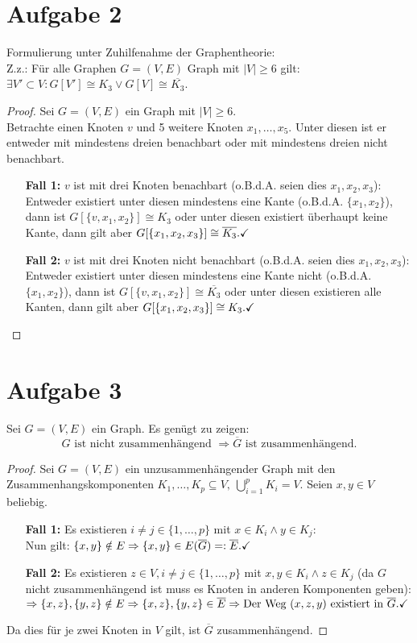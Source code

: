 \documentclass[a4paper,10pt,german]{scrartcl}
\newcommand{\komp}[1]{\ensuremath{\overline{#1}}}
\begin{document}
\section*{Aufgabe 2}
Formulierung unter Zuhilfenahme der Graphentheorie:\\
Z.z.: Für alle Graphen $G=(V,E)$ Graph mit $|V|\geq6$ gilt: $\exists V'\subset V:G[V']\cong K_3\vee G[V]\cong \komp{K_3}$.
\begin{proof}
 Sei $G=(V,E)$ ein Graph mit $|V|\geq6$.\\
 Betrachte einen Knoten $v$ und 5 weitere Knoten $x_1,\dots,x_5$. Unter diesen ist er entweder mit mindestens dreien benachbart oder mit mindestens dreien nicht benachbart.
 \begin{itemize}
  \item[{\bf Fall 1:}]$v$ ist mit drei Knoten benachbart (o.B.d.A. seien dies $x_1,x_2,x_3$):\\
  Entweder existiert unter diesen mindestens eine Kante (o.B.d.A. $\{x_1,x_2\}$), dann ist $G[\{v,x_1,x_2\}]\cong K_3$ oder unter diesen existiert überhaupt keine Kante, 
  dann gilt aber $G[\{x_1,x_2,x_3\}]\cong\komp{K_3}.\hfill \checkmark$
  \item[{\bf Fall 2:}]$v$ ist mit drei Knoten nicht benachbart (o.B.d.A. seien dies $x_1,x_2,x_3$):\\
  Entweder existiert unter diesen mindestens eine Kante nicht (o.B.d.A. $\{x_1,x_2\}$), dann ist $G[\{v,x_1,x_2\}]\cong \komp{K_3}$ oder unter diesen existieren alle Kanten, 
  dann gilt aber $G[\{x_1,x_2,x_3\}]\cong K_3.\hfill \checkmark$
 \end{itemize}
\end{proof}

\section*{Aufgabe 3}
Sei $G=(V,E)$ ein Graph. Es genügt zu zeigen: $$G\text{ ist nicht zusammenhängend }\Rightarrow \komp{G}\text{ ist zusammenhängend.}$$
\begin{proof}
Sei $G=(V,E)$ ein unzusammenhängender Graph mit den Zusammenhangskomponenten $K_1,\dots,K_p\subseteq V,\ \bigcup\limits_{i=1}^pK_i=V$. Seien $x,y\in V$ beliebig.
\begin{itemize}
 \item[{\bf Fall 1:}] Es existieren $i\neq j\in\{1,\dots,p\}$ mit $x\in K_i\wedge y\in K_j$:\\
 Nun gilt: $\{x,y\}\notin E\Rightarrow \{x,y\}\in E(\komp{G})=:\komp{E}.\hfill\checkmark$
 \item[{\bf Fall 2:}]Es existieren $z\in V, i\neq j\in\{1,\dots,p\}$ mit $x,y\in K_i\wedge z\in K_j$ (da $G$ nicht zusammenhängend ist muss es Knoten in anderen Komponenten geben):\\
 $\Rightarrow\{x,z\},\{y,z\}\notin E\Rightarrow \{x,z\},\{y,z\}\in\komp{E}\Rightarrow\text{Der Weg } (x,z,y)\text{ existiert in }\komp{G}.\hfill\checkmark$
\end{itemize}
Da dies für je zwei Knoten in $V$ gilt, ist $\komp{G}$ zusammenhängend. 
\end{proof}
\pagebreak
\end{document}

